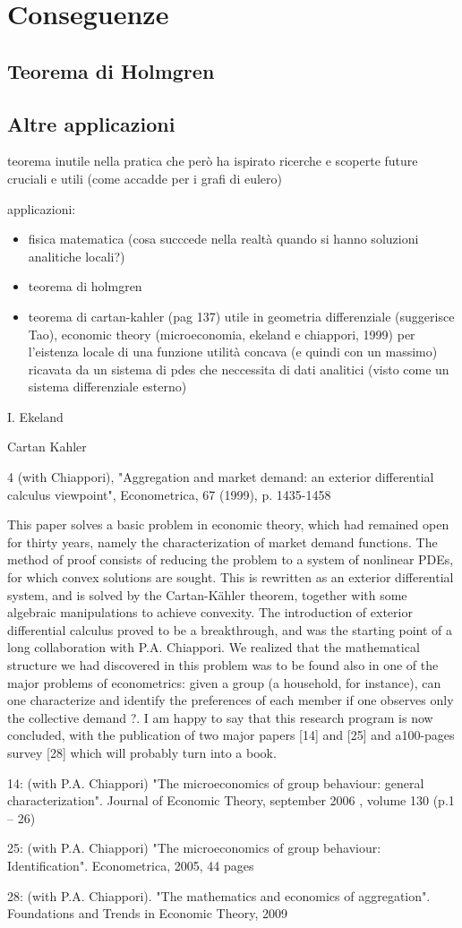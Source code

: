 \chapter{Conseguenze}
\section{Teorema di Holmgren}

\section{Altre applicazioni}
teorema inutile nella pratica che però ha ispirato ricerche e scoperte future cruciali e utili (come accadde per i grafi di eulero)

applicazioni:
\begin{itemize}
\item fisica matematica (cosa succcede nella realtà quando si hanno soluzioni analitiche locali?)
\item teorema di holmgren
\item teorema di cartan-kahler (pag 137) utile in geometria differenziale (suggerisce Tao), economic theory (microeconomia, ekeland e chiappori, 1999) per l'eistenza locale di una funzione utilità concava (e quindi con un massimo) ricavata da un sistema di pdes che neccessita di dati analitici (visto come un sistema differenziale esterno)
\end{itemize}

I. Ekeland

Cartan Kahler

4 (with Chiappori), "Aggregation and market demand: an exterior differential calculus viewpoint", Econometrica, 67 (1999), p. 1435-1458

This paper solves a basic problem in economic theory, which had remained open for thirty years, namely the characterization of market demand functions. The method of proof consists of reducing the problem to a system of nonlinear PDEs, for which convex solutions are sought. This is rewritten as an exterior differential system, and is solved by the Cartan-Kähler theorem, together with some algebraic manipulations to achieve convexity. The introduction of exterior differential calculus proved to be a breakthrough, and was the starting point of a long collaboration with P.A. Chiappori. We realized that the mathematical structure we had discovered in this problem was to be found also in one of the major problems of econometrics: given a group (a household, for instance), can one characterize and identify the preferences of each member if one observes only the collective demand ?. I am happy to say that this research program is now concluded, with the publication of two major papers [14] and [25] and a100-pages survey [28] which will probably turn into a book.

14: (with P.A. Chiappori) "The microeconomics of group behaviour: general characterization". Journal of Economic Theory, september 2006 , volume 130 (p.1 – 26)

25: (with P.A. Chiappori) "The microeconomics of group behaviour: Identification". Econometrica, 2005, 44 pages

28: (with P.A. Chiappori). "The mathematics and economics of aggregation". Foundations and Trends in Economic Theory, 2009
